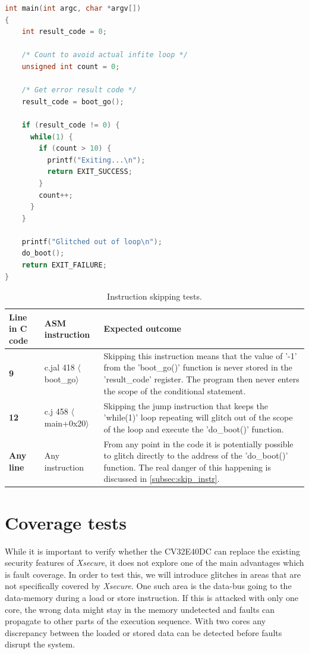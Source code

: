 \begin{lstlisting}[caption={Test code for simulating instruction skip.}, label=lst:test_code, language=C++]
int main(int argc, char *argv[])
{
    int result_code = 0;

    /* Count to avoid actual infite loop */
    unsigned int count = 0;

    /* Get error result code */
    result_code = boot_go();

    if (result_code != 0) {
      while(1) {
       	if (count > 10)	{
          printf("Exiting...\n");
       	  return EXIT_SUCCESS;
        }
        count++;
      }
    }

    printf("Glitched out of loop\n");
    do_boot();
    return EXIT_FAILURE;
}
\end{lstlisting}

\begin{table}[h]
\centering
\caption{Instruction skipping tests.}
\label{tab:instr_skip_test}
\begin{tabular}{m{2.5cm}m{3.5cm}m{7.5cm}}
\toprule 
Line in C code & ASM instruction & Expected outcome \\
\midrule
\rowcolor{black!20} \textbf{9} & c.jal 418 $\langle$boot\_go$\rangle$ & Skipping this instruction means that the value of '-1' from the 'boot\_go()' function is never stored in the 'result\_code' register. The program then never enters the scope of the conditional statement. \\
\textbf{12} & c.j 458 $\langle$main+0x20$\rangle$ & Skipping the jump instruction that keeps the 'while(1)' loop repeating will glitch out of the scope of the loop and execute the 'do\_boot()' function.  \\
\rowcolor{black!20} \textbf{Any line} & Any instruction & From any point in the code it is potentially possible to glitch directly to the address of the 'do\_boot()' function. The real danger of this happening is discussed in \autoref{subsec:skip_instr}. \\
\bottomrule
\end{tabular}
\end{table}

\section{Coverage tests}
\label{sec:coverage_test}

While it is important to verify whether the CV32E40DC can replace the existing security features of \textit{Xsecure}, it does not explore one of the main advantages which is fault coverage. In order to test this, we will introduce glitches in areas that are not specifically covered by \textit{Xsecure}. One such area is the data-bus going to the data-memory during a load or store instruction. If this is attacked with only one core, the wrong data might stay in the memory undetected and faults can propagate to other parts of the execution sequence. With two cores any discrepancy between the loaded or stored data can be detected before faults disrupt the system. 


